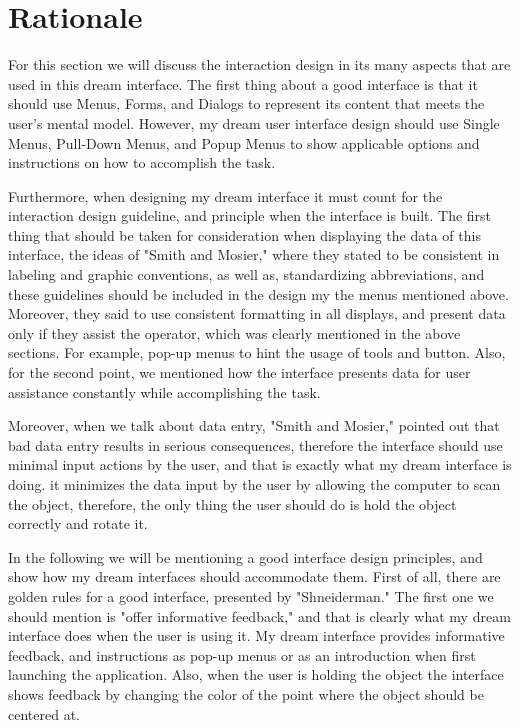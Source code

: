 \documentclass[12pt, oneside]{amsart}   	%
\begin{document}
\section{Rationale}

For this section we will discuss the interaction design in its many aspects that are used in this dream interface. The first thing about a good interface is that it should use Menus, Forms, and Dialogs to represent its content that meets the user's mental model. However, my dream user interface design should use Single Menus, Pull-Down Menus, and Popup Menus to show applicable options and instructions on how to accomplish the task. 

Furthermore, when designing my dream interface it must count for the interaction design guideline, and principle when the interface is built. The first thing that should be taken for consideration when displaying the data of this interface, the ideas of "Smith and Mosier," where they stated to be consistent in labeling and graphic conventions, as well as, standardizing abbreviations, and these guidelines should be included in the design my the menus mentioned above.  Moreover, they said to use consistent formatting in all displays, and present data only if they assist the operator, which was clearly mentioned in the above sections.  For example, pop-up menus to hint the usage of tools and button.  Also, for the second point, we mentioned how the interface presents data for user assistance constantly while accomplishing the task.

Moreover, when we talk about data entry, "Smith and Mosier," pointed out that bad data entry results in serious consequences, therefore the interface should use minimal input actions by the user, and that is exactly what my dream interface is doing. it minimizes the data input by the user by allowing the computer to scan the object, therefore, the only thing the user should do is hold the object correctly and rotate it. 

In the following we will be mentioning a good interface design principles, and show how my dream interfaces should accommodate them.  First of all, there are golden rules for a good interface, presented by "Shneiderman." %
The first one we should mention is "offer informative feedback," and that is clearly what my dream interface does when the user is using it.  My dream interface provides informative feedback, and instructions as pop-up menus or as an introduction when first launching the application.  Also, when the user is holding the object the interface shows feedback by changing the color of the point where the object should be centered at. 
\end{document}
